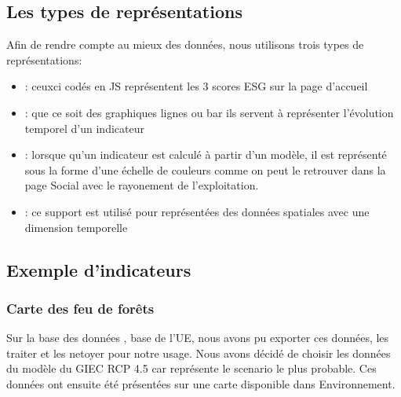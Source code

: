 \documentclass[letterpaper,10pt,french]{sphinxmanual}
\begin{document}
\subsection{Les types de représentations}
\label{\detokenize{indicateurs:les-types-de-representations}}
\sphinxAtStartPar
Afin de rendre compte au mieux des données, nous utilisons trois types de représentations:
\begin{itemize}
\item {} 
\sphinxAtStartPar
{}: ceux\sphinxhyphen{}ci codés en JS représentent les 3 scores ESG sur la page d’accueil

\item {} 
\sphinxAtStartPar
{}: que ce soit des graphiques lignes ou bar ils servent à représenter l’évolution temporel d’un indicateur

\item {} 
\sphinxAtStartPar
{}: lorsque qu’un indicateur est calculé à partir d’un modèle, il est représenté sous la forme d’une échelle de couleurs comme on peut le retrouver dans la page Social avec le rayonement de l’exploitation.

\item {} 
\sphinxAtStartPar
{}: ce support est utilisé pour représentées des données spatiales avec une dimension temporelle

\end{itemize}


\subsection{Exemple d’indicateurs}
\label{\detokenize{indicateurs:exemple-d-indicateurs}}

\subsubsection{Carte des feu de forêts}
\label{\detokenize{indicateurs:carte-des-feu-de-forets}}
\sphinxAtStartPar
Sur la base des données , base de l’UE, nous avons pu exporter ces données, les traiter et les netoyer pour notre usage. Nous avons décidé de choisir les données du modèle du GIEC RCP 4.5 car représente le scenario le plus probable.
Ces données ont ensuite été présentées sur une carte disponible dans Environnement.
\end{document}
